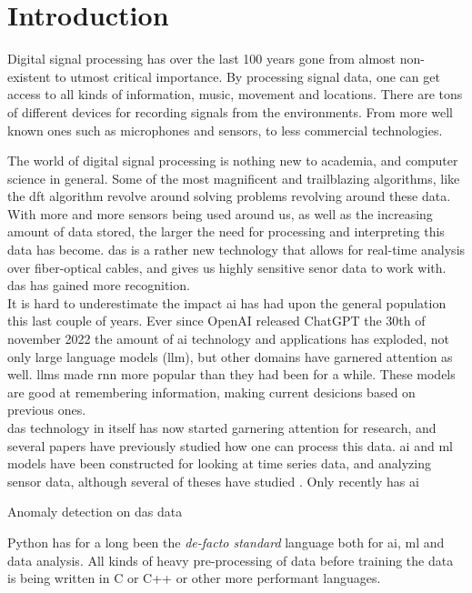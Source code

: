 \chapter{Introduction}
\label{chap:introduction}

Digital signal processing has over the last 100 years gone from almost non-existent to utmost critical importance. By processing signal data, one can get access to all kinds of information, music, movement and locations. There are tons of different devices for recording signals from the environments. From more well known ones such as microphones and sensors, to less commercial technologies.

The world of digital signal processing is nothing new to academia, and computer science in general. Some of the most magnificent and trailblazing algorithms, like the \acrfull{dft} algorithm revolve around solving problems revolving around these data. With more and more sensors being used around us, as well as the increasing amount of data stored, the larger the need for processing and interpreting this data has become. 
\acrfull{das} is a rather new technology that allows for real-time analysis over fiber-optical cables, and gives us highly sensitive senor data to work with. \acrshort{das} has gained more recognition. \\

It is hard to underestimate the impact \acrshort{ai} has had upon the general population this last couple of years. Ever since OpenAI released ChatGPT the 30th of november 2022 \cite{chatgpt} the amount of \acrshort{ai} technology and applications has exploded, not only large language models (\acrshort{llm}), but other domains have garnered attention as well. \acrshort{llm}s made \acrfull{rnn} more popular than they had been for a while. These models are good at remembering information, making current desicions based on previous ones. \\ 

\acrshort{das} technology in itself has now started garnering attention for research, and several papers have previously studied  how one can process this data. \acrshort{ai} and \acrshort{ml} models have been constructed for looking at time series data, and analyzing sensor data, although several of theses have studied .  Only recently has \acrshort{ai}

Anomaly detection on \acrshort{das} data


Python has for a long been the \textit{de-facto standard} language both for \acrshort{ai}, \acrshort{ml} and data analysis. All kinds of heavy pre-processing of data before training the data is being written in C or C++ or other more performant languages.    




